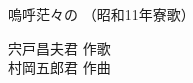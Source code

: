 \documentclass[10pt,b5j]{tarticle} %
\begin{document}
\begin{minipage}[c]{0.7\hsize} %
    \begin{center}
        {\LARGE
            嗚呼茫々の %
        }
        {\small 
            （昭和11年寮歌） %
        }
    \end{center}
\end{minipage}
\begin{minipage}[c]{0.3\hsize} %
    \begin{flushright} %
        宍戸昌夫君 作歌\\村岡五郎君 作曲 %
    \end{flushright}
\end{minipage}
\end{document}
